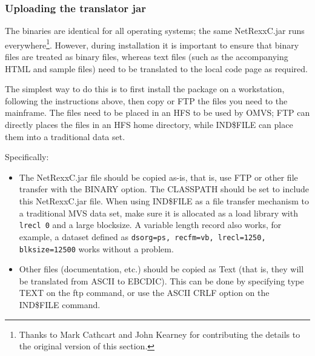 \subsubsection{Uploading the \nr{} translator jar}

The \nr{} binaries are identical for all operating systems; the same
NetRexxC.jar runs everywhere\footnote{Thanks to Mark Cathcart
  and John Kearney for contributing the details to the original version of this section.}.
However, during installation it is important to ensure that binary files
are treated as binary files, whereas text files (such as the
accompanying HTML and sample files) need to be translated to the local code
page as required. 

The simplest way to do this is to first install the package on a
workstation, following the instructions above, then copy or FTP the
files you need to the mainframe.  The files need to be placed in an
HFS to be used by OMVS; FTP can directly places the files in an HFS
home directory, while IND\$FILE can place them into a traditional data
set.

Specifically:
\begin{itemize}
\item The NetRexxC.jar file should be copied as-is, that is, use
FTP or other file transfer with the BINARY option.  The CLASSPATH should
be set to include this NetRexxC.jar file. When using IND\$FILE as a
file transfer mechanism to a traditional MVS data set, make sure it is
allocated as a load library with \texttt{lrecl 0} and a large
blocksize. A variable length record also works, for example, a dataset
defined as \texttt{dsorg=ps, recfm=vb, lrecl=1250, blksize=12500}
works without a problem.
\item Other files (documentation, etc.) should be copied as Text (that is,
they will be translated from ASCII to EBCDIC). This can be done by specifying type TEXT on the ftp
command, or use the ASCII CRLF option on the IND\$FILE command.
\end{itemize}

